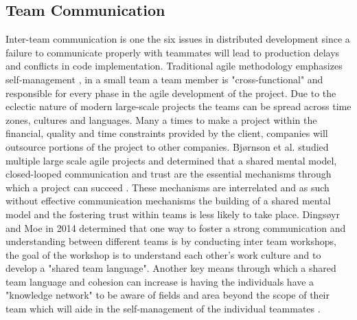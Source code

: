 \documentclass[sigplan,screen]{acmart}
\begin{document}
\subsection{Team Communication}
Inter-team communication is one the six issues in distributed development \cite{Jeff} since a failure to communicate properly with teammates will lead to production delays and conflicts in code implementation. Traditional agile methodology emphasizes self-management \cite{Dingsøyr14}, in a small team a team member is "cross-functional" and responsible for every phase in the agile development of the project. Due to the eclectic nature of modern large-scale projects the teams can be spread across time zones, cultures and languages. Many a times to make a project within the financial, quality and time constraints provided by the client, companies will outsource portions of the project to other companies.  Bj{\o}rnson et al. studied multiple large scale agile projects and determined that a shared mental model, closed-looped communication and trust are the essential mechanisms through which a project can succeed \cite{Bjørnson}. These mechanisms are interrelated and as such without effective communication mechanisms the building of a shared mental model and the fostering trust within teams is less likely to take place. Dings{\o}yr and Moe in 2014 determined that one way to foster a strong communication and understanding between different teams is by conducting inter team workshops, the goal of the workshop is to understand each other's work  culture and to develop a "shared team language"\cite{Dingsøyr14}. Another key means through which a shared team language and cohesion can increase is having the individuals have a "knowledge network" to be aware of fields and area beyond the scope of their team which will aide in the self-management of the individual teammates \cite{Dingsøyr14}.\\
\end{document}
